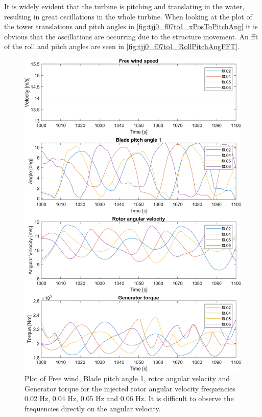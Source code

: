 It is widely evident that the turbine is pitching and translating in the water, resulting in great oscillations in the whole turbine. When looking at the plot of the tower translations and pitch angles in \cref{fig:tjj0_f07to1_xPosToPitchAng} it is obvious that the oscillations are occurring due to the structure movement. An fft of the roll and pitch angles are seen in \cref{fig:tjj0_f07to1_RollPitchAngFFT}.
\begin{figure}[h]
	\centering
	\includegraphics[width=0.8\linewidth]{Graphics/TestResults/tj00/tjj0_f02to06VfreeToMgen.png}
	\caption{Plot of Free wind, Blade pitch angle 1, rotor angular velocity and Generator torque for the injected rotor angular velocity frequencies 0.02 Hz, 0.04 Hz, 0.05 Hz and 0.06 Hz. It is difficult to observe the frequencies directly on the angular velocity.}
	\label{fig:tjj0_f02to06VfreeToMgen}
\end{figure}

